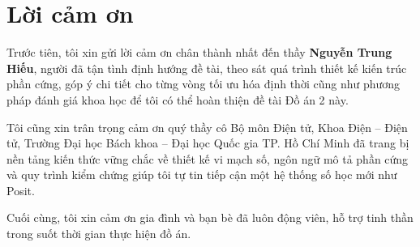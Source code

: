 \clearpage
\chapter*{Lời cảm ơn}
Trước tiên, tôi xin gửi lời cảm ơn chân thành nhất đến thầy \textbf{Nguyễn Trung Hiếu}, người đã tận tình định hướng đề tài, theo sát quá trình thiết kế kiến trúc phần cứng, góp ý chi tiết cho từng vòng tối ưu hóa định thời cũng như phương pháp đánh giá khoa học để tôi có thể hoàn thiện đề tài Đồ án 2 này.

Tôi cũng xin trân trọng cảm ơn quý thầy cô Bộ môn Điện tử, Khoa Điện -- Điện tử, Trường Đại học Bách khoa -- Đại học Quốc gia TP. Hồ Chí Minh đã trang bị nền tảng kiến thức vững chắc về thiết kế vi mạch số, ngôn ngữ mô tả phần cứng và quy trình kiểm chứng giúp tôi tự tin tiếp cận một hệ thống số học mới như Posit.

Cuối cùng, tôi xin cảm ơn gia đình và bạn bè đã luôn động viên, hỗ trợ tinh thần trong suốt thời gian thực hiện đồ án.
